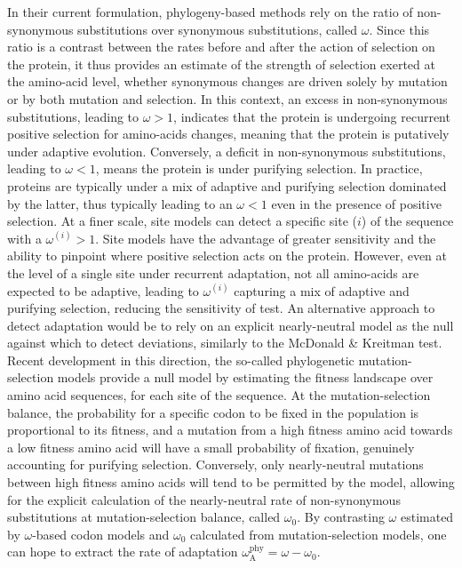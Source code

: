 \documentclass{article}
\newcommand{\rateApop}{\omega_{\mathrm{A}}}
\newcommand{\rateAphy}{\rateApop^{\mathrm{phy}}}
\begin{document}
    In their current formulation, phylogeny-based methods rely on the ratio of non-synonymous substitutions over synonymous substitutions, called $\omega$\cite{muse_likelihood_1994,goldman_codonbased_1994}.
    Since this ratio is a contrast between the rates before and after the action of selection on the protein, it thus provides an estimate of the strength of selection exerted at the amino-acid level, whether synonymous changes are driven solely by mutation or by both mutation and selection\cite{yang_mutationselection_2008}.
    In this context, an excess in non-synonymous substitutions, leading to $\omega>1$, indicates that the protein is undergoing recurrent positive selection for amino-acids changes, meaning that the protein is putatively under adaptive evolution.
    Conversely, a deficit in non-synonymous substitutions, leading to $\omega<1$, means the protein is under purifying selection.
    In practice, proteins are typically under a mix of adaptive and purifying selection dominated by the latter, thus typically leading to an $\omega<1$ even in the presence of positive selection.
    At a finer scale, site models can detect a specific site ($i$) of the sequence with a $\omega^{(i)}>1$\cite{yang_codonsubstitution_2000, kosiol_patterns_2008}.
    Site models have the advantage of greater sensitivity and the ability to pinpoint where positive selection acts on the protein.
    However, even at the level of a single site under recurrent adaptation, not all amino-acids are expected to be adaptive, leading to $\omega^{(i)}$ capturing a mix of adaptive and purifying selection, reducing the sensitivity of test.
    An alternative approach to detect adaptation would be to rely on an explicit nearly-neutral model as the null against which to detect deviations, similarly to the McDonald \& Kreitman test.
    Recent development in this direction, the so-called phylogenetic mutation-selection models provide a null model by estimating the fitness landscape over amino acid sequences, for each site of the sequence\cite{yang_mutationselection_2008, halpern_evolutionary_1998, rodrigue_mechanistic_2010}.
    At the mutation-selection balance, the probability for a specific codon to be fixed in the population is proportional to its fitness, and a mutation from a high fitness amino acid towards a low fitness amino acid will have a small probability of fixation, genuinely accounting for purifying selection.
    Conversely, only nearly-neutral mutations between high fitness amino acids will tend to be permitted by the model, allowing for the explicit calculation of the nearly-neutral rate of non-synonymous substitutions at mutation-selection balance, called $\omega_{0}$\cite{spielman_relationship_2015, rodrigue_detecting_2017}.
    By contrasting $\omega$ estimated by $\omega$-based codon models and $\omega_{0}$ calculated from mutation-selection models, one can hope to extract the rate of adaptation $\rateAphy = \omega - \omega_{0}$.
\end{document}
